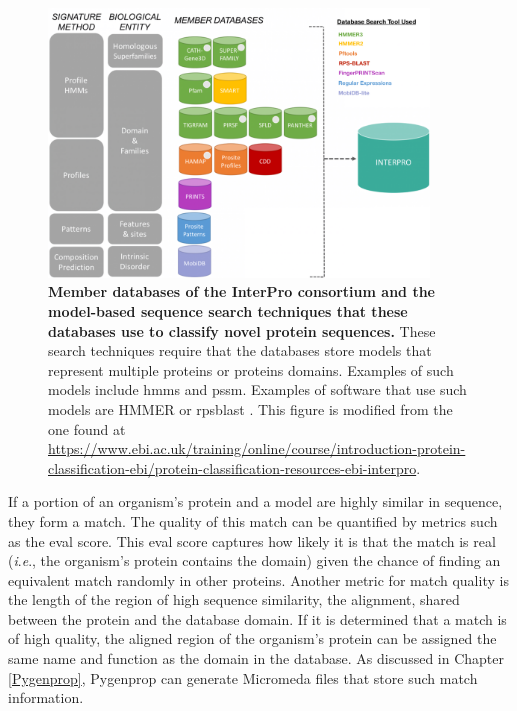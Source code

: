 \begin{figure}[!ht]
  \centering
	\includegraphics[width=0.9\textwidth]{media/InterPro.png}
	 \caption[Member databases of the InterPro consortium and the model-based 
sequence search techniques that these databases use to classify novel protein 
sequences.]{\textbf{Member databases of the InterPro consortium and the 
model-based sequence search techniques that these databases use to classify 
novel protein sequences.} These search techniques require that the databases 
store models that represent multiple proteins or proteins domains. Examples of 
such models include \gls{hmm}s and \gls{pssm}. Examples of software that use 
such models are HMMER \cite{eddy2011accelerated} or \gls{rpsblast} 
\cite{mcginnis2004blast}. This figure is modified from the one found at 
\href{https://www.ebi.ac.uk/training/online/course/introduction-protein-classification-ebi/protein-classification-resources-ebi-interpro}{https://www.ebi.ac.uk/training/online/course/introduction-protein-classification-ebi/protein-classification-resources-ebi-interpro}.}
	 \label{fig:interpro-databases}
\end{figure}

If a portion of an organism's protein and a model are highly similar in 
sequence, they form a match. The quality of this match can be quantified by 
metrics such as the \gls{eval} score. This \gls{eval} score captures how likely 
it is that the match is real (\textit{i}.\textit{e}., the organism's protein contains the 
domain) given the chance of finding an equivalent match randomly in other 
proteins. Another metric for match quality is the length of the region of high 
sequence similarity, the alignment, shared between the protein and the database 
domain. If it is determined that a match is of high quality, the aligned region 
of the organism's protein can be assigned the same name and function as the 
domain in the database.  As discussed in Chapter \ref{Pygenprop}, Pygenprop can 
generate Micromeda files that store such match information.

